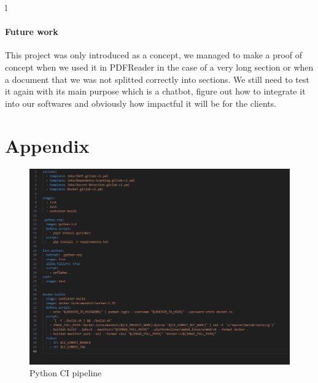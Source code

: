 l\documentclass[a4paper,12pt,twoside]{report}
\begin{document}
\subsubsection{Future work}
This project was only introduced as a concept, we managed to make a proof of concept when we used it in PDFReader in the case of a very long section or when a document that we was not splitted correctly into sections. We still need to test it again with its main purpose which is a chatbot, figure out how to integrate it into our softwares and obviously how impactful it will be for the clients.





\appendix
\appendixpage
\addappheadtotoc
\chapter{Appendix}\label{appendix}
\begin{figure}[H]
		\includegraphics[width=\textwidth, keepaspectratio ]{images/python-yaml}
	\caption[Python CI pipeline]{Python CI pipeline}
\label{Python Pipeline}
\end{figure}	
\end{document}
